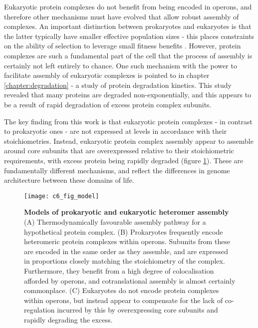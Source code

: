 \documentclass[a4paper,11pt,twoside,openright]{scrbook}
\begin{document}
Eukaryotic protein complexes do not benefit from being encoded in operons, and
therefore other mechanisms must have evolved that allow robust assembly of
complexes. An important distinction between prokaryotes and eukaryotes is that
the latter typically have smaller effective population sizes - this places
constraints on the ability of selection to leverage small fitness benefits
\cite{Kimura1962,Lynch2011}. However, protein complexes are such a fundamental
part of the cell that the process of assembly is certainly not left entirely to
chance. One such mechanism with the power to facilitate assembly of eukaryotic
complexes is pointed to in chapter \ref{chapter:degradation} - a study of
protein degradation kinetics. This study revealed that many proteins are
degraded non-exponentially, and this appears to be a result of rapid degradation
of excess protein complex subunits.

The key finding from this work is that eukaryotic protein complexes - in
contrast to prokaryotic ones \cite{Li2014b} - are not expressed at levels in
accordance with their stoichiometries. Instead, eukaryotic protein complex
assembly appear to assemble around core subunits that are overexpressed relative
to their stoichiometric requirements, with excess protein being rapidly degraded
(figure \ref{figure:conclusionmodel}). These are fundamentally different
mechanisms, and reflect the differences in genome architecture between these
domains of life.

\begin{figure} \texttt{[image: c6\_fig\_model]} \caption[Models of prokaryotic and
    eukaryotic heteromer assembly]{\sffamily \textbf{Models of prokaryotic and
    eukaryotic heteromer assembly} \\ \small (A) Thermodynamically favourable
    assembly pathway for a hypothetical protein complex. (B) Prokaryotes
    frequently encode heteromeric protein complexes within operons. Subunits
    from these are encoded in the same order as they assemble, and are expressed
    in proportions closely matching the stoichiometry of the complex.
    Furthermore, they benefit from a high degree of colocalisation afforded by
    operons, and cotranslational assembly is almost certainly commonplace. (C)
    Eukaryotes do not encode protein complexes within operons, but instead
    appear to compensate for the lack of co-regulation incurred by this by
    overexpressing core subunits and rapidly degrading the excess.}
\label{figure:conclusionmodel} \end{figure}
\end{document}
